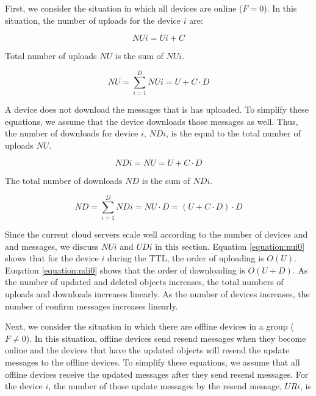 \documentclass[a4paper,11pt]{report}
\begin{document}
First, we consider the situation in which all devices are online ($F=0$).
In this situation, the number of uploads for the device $i$ are:

\begin{equation}
NUi = Ui + C
\label{equation:nui0}
\end{equation}

Total number of uploads $NU$ is the sum of $NUi$.

\begin{equation}
NU = \sum_{i = 1}^{D} NUi = U + C \cdot D
\label{equation:nu0}
\end{equation}

A device does not download the messages that is has uploaded.
To simplify these equations, we assume that the device downloads those messages as well.
Thus, the number of downloads for device $i$, $NDi$, is the equal to the total number of uploads $NU$.

\begin{equation}
NDi = NU = U + C \cdot D
\label{equation:ndi0}
\end{equation}

The total number of downloads $ND$ is the sum of $NDi$.

\begin{equation}
ND = \sum_{i = 1}^{D} NDi = NU \cdot D =  (U + C \cdot D) \cdot D
\label{equation:nd0}
\end{equation}

Since the current cloud servers scale well according to the number of devices and and messages, we discuss $NUi$ and $UDi$ in this section.
Equation \ref{equation:nui0} shows that for the device $i$ during the TTL, the order of uploading is $O(U)$.
Euqation \ref{equation:ndi0} shows that the order of downloading is $O(U+D)$.
As the number of updated and deleted objects increases, the total numbers of uploads and downloads increases linearly.
As the number of devices increases, the number of confirm messages increases linearly.

Next, we consider the situation in which there are offline devices in a group ($F \neq 0$).
In this situation, offline devices send resend messages when they become online and the devices that have the updated objects will resend the update messages to the offline devices.
To simplify these equations, we assume that all offline devices receive the updated messages after they send resend messages.
For the device $i$, the number of those update messages by the resend message, $URi$, is
\end{document}
